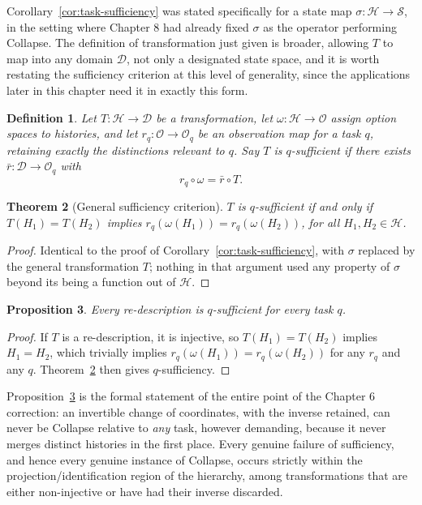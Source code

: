 \documentclass[11pt]{book}
\newtheorem{theorem}{Theorem}[chapter]
\newtheorem{proposition}[theorem]{Proposition}
\newtheorem{definition}[theorem]{Definition}
\begin{document}
Corollary~\ref{cor:task-sufficiency} was stated specifically for a state map $\sigma:\mathcal H\to\mathcal S$, in the setting where Chapter 8 had already fixed $\sigma$ as the operator performing Collapse. The definition of transformation just given is broader, allowing $T$ to map into any domain $\mathcal D$, not only a designated state space, and it is worth restating the sufficiency criterion at this level of generality, since the applications later in this chapter need it in exactly this form.

\begin{definition}
Let $T:\mathcal H\to\mathcal D$ be a transformation, let $\omega:\mathcal H\to\mathcal O$ assign option spaces to histories, and let $r_q:\mathcal O\to\mathcal O_q$ be an observation map for a task $q$, retaining exactly the distinctions relevant to $q$. Say $T$ is \emph{$q$-sufficient} if there exists $\bar r:\mathcal D\to\mathcal O_q$ with
\[
r_q\circ\omega = \bar r \circ T.
\]
\end{definition}

\begin{theorem}[General sufficiency criterion]
\label{thm:general-sufficiency}
$T$ is $q$-sufficient if and only if $T(H_1)=T(H_2)$ implies $r_q(\omega(H_1))=r_q(\omega(H_2))$, for all $H_1,H_2\in\mathcal H$.
\end{theorem}
\begin{proof}
Identical to the proof of Corollary~\ref{cor:task-sufficiency}, with $\sigma$ replaced by the general transformation $T$; nothing in that argument used any property of $\sigma$ beyond its being a function out of $\mathcal H$.
\end{proof}

\begin{proposition}
\label{prop:redescription-sufficient}
Every re-description is $q$-sufficient for every task $q$.
\end{proposition}
\begin{proof}
If $T$ is a re-description, it is injective, so $T(H_1)=T(H_2)$ implies $H_1=H_2$, which trivially implies $r_q(\omega(H_1))=r_q(\omega(H_2))$ for any $r_q$ and any $q$. Theorem~\ref{thm:general-sufficiency} then gives $q$-sufficiency.
\end{proof}

Proposition~\ref{prop:redescription-sufficient} is the formal statement of the entire point of the Chapter 6 correction: an invertible change of coordinates, with the inverse retained, can never be Collapse relative to \emph{any} task, however demanding, because it never merges distinct histories in the first place. Every genuine failure of sufficiency, and hence every genuine instance of Collapse, occurs strictly within the projection/identification region of the hierarchy, among transformations that are either non-injective or have had their inverse discarded.
\end{document}
